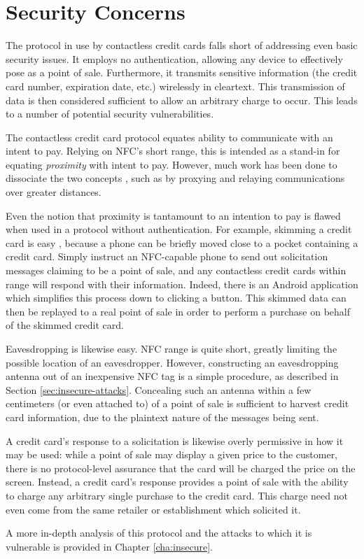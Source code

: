 \section{Security Concerns}
\label{sec:intro-problem}

The protocol in use by contactless credit cards falls short of addressing even basic security issues.
It employs no authentication, allowing any device to effectively pose as a point of sale.
Furthermore, it transmits sensitive information (the credit card number, expiration date, etc.) wirelessly in cleartext.
This transmission of data is then considered sufficient to allow an arbitrary charge to occur.
This leads to a number of potential security vulnerabilities.

The contactless credit card protocol equates ability to communicate with an intent to pay.
Relying on NFC's short range, this is intended as a stand-in for equating \emph{proximity} with intent to pay.
However, much work has been done to dissociate the two concepts \cite{brown2013evaluating, Drimer:2007:KYE:1362903.1362910, francis2010practical, hancke2005practical, kfir2005picking, markantonakis2012practical}, such as by proxying and relaying communications over greater distances.

Even the notion that proximity is tantamount to an intention to pay is flawed when used in a protocol without authentication.
For example, skimming a credit card is easy \cite{lee2012nfc, lifchitz2012hacking, roland2013cloning}, because a phone can be briefly moved close to a pocket containing a credit card.
Simply instruct an NFC-capable phone to send out solicitation messages claiming to be a point of sale, and any contactless credit cards within range will respond with their information.
Indeed, there is an Android application \cite{NFCProxy} which simplifies this process down to clicking a button.
This skimmed data can then be replayed to a real point of sale in order to perform a purchase on behalf of the skimmed credit card.

Eavesdropping is likewise easy.
NFC range is quite short, greatly limiting the possible location of an eavesdropper.
However, constructing an eavesdropping antenna out of an inexpensive NFC tag is a simple procedure, as described in Section \ref{sec:insecure-attacks}.
Concealing such an antenna within a few centimeters (or even attached to) of a point of sale is sufficient to harvest credit card information,
    due to the plaintext nature of the messages being sent.

A credit card's response to a solicitation is likewise overly permissive in how it may be used:
    while a point of sale may display a given price to the customer, there is no protocol-level assurance that the card will be charged the price on the screen.
Instead, a credit card's response provides a point of sale with the ability to charge any arbitrary single purchase to the credit card.
This charge need not even come from the same retailer or establishment which solicited it.

A more in-depth analysis of this protocol and the attacks to which it is vulnerable is provided in Chapter \ref{cha:insecure}.
